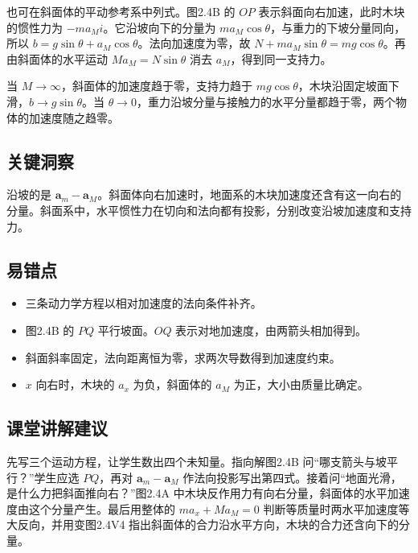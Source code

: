 \documentclass[UTF8,fontset=fandol,a4paper,11pt]{ctexart}
\newcommand{\vect}[1]{\bm{#1}}
\begin{document}
也可在斜面体的平动参考系中列式。图2.4B 的 $OP$ 表示斜面向右加速，此时木块的惯性力为 $-ma_M\hat i$。它沿坡向下的分量为 $ma_M\cos\theta$，与重力的下坡分量同向，所以 $b=g\sin\theta+a_M\cos\theta$。法向加速度为零，故 $N+ma_M\sin\theta=mg\cos\theta$。再由斜面体的水平运动 $Ma_M=N\sin\theta$ 消去 $a_M$，得到同一支持力。

当 $M\to\infty$，斜面体的加速度趋于零，支持力趋于 $mg\cos\theta$，木块沿固定坡面下滑，$b\to g\sin\theta$。当 $\theta\to0$，重力沿坡分量与接触力的水平分量都趋于零，两个物体的加速度随之趋零。



\subsection*{关键洞察}

沿坡的是 $\vect a_m-\vect a_M$。斜面体向右加速时，地面系的木块加速度还含有这一向右的分量。斜面系中，水平惯性力在切向和法向都有投影，分别改变沿坡加速度和支持力。



\subsection*{易错点}

\begin{itemize}
\item 三条动力学方程以相对加速度的法向条件补齐。
\item 图2.4B 的 $PQ$ 平行坡面。$OQ$ 表示对地加速度，由两箭头相加得到。
\item 斜面斜率固定，法向距离恒为零，求两次导数得到加速度约束。
\item $x$ 向右时，木块的 $a_x$ 为负，斜面体的 $a_M$ 为正，大小由质量比确定。
\end{itemize}



\subsection*{课堂讲解建议}

先写三个运动方程，让学生数出四个未知量。指向解图2.4B 问“哪支箭头与坡平行？”学生应选 $PQ$，再对 $\vect a_m-\vect a_M$ 作法向投影写出第四式。接着问“地面光滑，是什么力把斜面推向右？”图2.4A 中木块反作用力有向右分量，斜面体的水平加速度由这个分量产生。最后用整体的 $ma_x+Ma_M=0$ 判断等质量时两水平加速度等大反向，并用变图2.4V4 指出斜面体的合力沿水平方向，木块的合力还含向下的分量。
\end{document}

